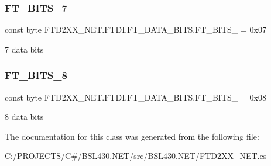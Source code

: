 \subsubsection{\texorpdfstring{FT\_BITS\_7}{FT\_BITS\_7}}
{\footnotesize\ttfamily const byte F\+T\+D2\+X\+X\+\_\+\+N\+E\+T.\+F\+T\+D\+I.\+F\+T\+\_\+\+D\+A\+T\+A\+\_\+\+B\+I\+T\+S.\+F\+T\+\_\+\+B\+I\+T\+S\+\_ = 0x07}



7 data bits 

\mbox{\label{class_f_t_d2_x_x___n_e_t_1_1_f_t_d_i_1_1_f_t___d_a_t_a___b_i_t_s_aba9d6c938c4d31337d5a3e2e7b4f5a72}} 
\subsubsection{\texorpdfstring{FT\_BITS\_8}{FT\_BITS\_8}}
{\footnotesize\ttfamily const byte F\+T\+D2\+X\+X\+\_\+\+N\+E\+T.\+F\+T\+D\+I.\+F\+T\+\_\+\+D\+A\+T\+A\+\_\+\+B\+I\+T\+S.\+F\+T\+\_\+\+B\+I\+T\+S\+\_ = 0x08}



8 data bits 



The documentation for this class was generated from the following file\+:\begin{DoxyCompactItemize}
\item 
C\+:/\+P\+R\+O\+J\+E\+C\+T\+S/\+C\#/\+B\+S\+L430.\+N\+E\+T/src/\+B\+S\+L430.\+N\+E\+T/F\+T\+D2\+X\+X\+\_\+\+N\+E\+T.\+cs\end{DoxyCompactItemize}
